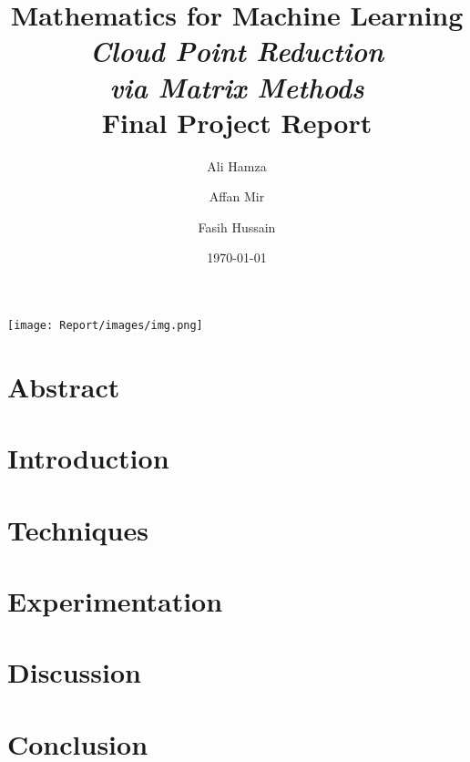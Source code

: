 \documentclass[a4paper, 11pt]{article}
\title{\huge Mathematics for Machine Learning \\ \Huge { \textit{Cloud Point Reduction \\via Matrix Methods}\\ \LARGE Final Project Report }}
\author{Ali Hamza \and Affan Mir \and Fasih Hussain}
\date{\today}
\begin{document}
\maketitle
\begin{center}
    \texttt{[image: Report/images/img.png]}
\end{center}
\newpage

\section{Abstract}
\section{Introduction}
\section{Techniques}
\section{Experimentation}
\section{Discussion}
\section{Conclusion}
\end{document}
